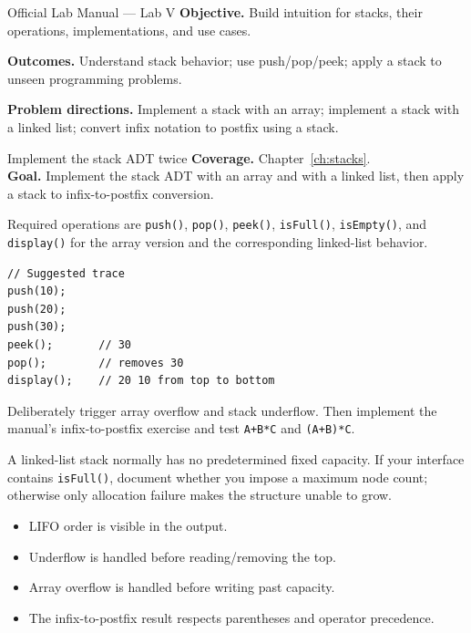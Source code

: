 
\begin{sourcealignment}{Official Lab Manual --- Lab V}
\textbf{Objective.} Build intuition for stacks, their operations, implementations, and use cases.

\textbf{Outcomes.} Understand stack behavior; use push/pop/peek; apply a stack to unseen programming problems.

\textbf{Problem directions.} Implement a stack with an array; implement a stack with a linked list; convert infix notation to postfix using a stack.
\end{sourcealignment}

\begin{labproject}{Implement the stack ADT twice}
\textbf{Coverage.} Chapter~\ref{ch:stacks}.\\
\textbf{Goal.} Implement the stack ADT with an array and with a linked list, then apply a stack to infix-to-postfix conversion.

Required operations are \texttt{push()}, \texttt{pop()}, \texttt{peek()}, \texttt{isFull()}, \texttt{isEmpty()}, and \texttt{display()} for the array version and the corresponding linked-list behavior.

\begin{lstlisting}
// Suggested trace
push(10);
push(20);
push(30);
peek();       // 30
pop();        // removes 30
display();    // 20 10 from top to bottom
\end{lstlisting}

\begin{tryit}
Deliberately trigger array overflow and stack underflow. Then implement the manual's infix-to-postfix exercise and test \texttt{A+B*C} and \texttt{(A+B)*C}.
\end{tryit}

\begin{clarification}
A linked-list stack normally has no predetermined fixed capacity. If your interface contains \texttt{isFull()}, document whether you impose a maximum node count; otherwise only allocation failure makes the structure unable to grow.
\end{clarification}
\end{labproject}

\begin{verification}
\begin{itemize}
  \item LIFO order is visible in the output.
  \item Underflow is handled before reading/removing the top.
  \item Array overflow is handled before writing past capacity.
  \item The infix-to-postfix result respects parentheses and operator precedence.
\end{itemize}
\end{verification}

